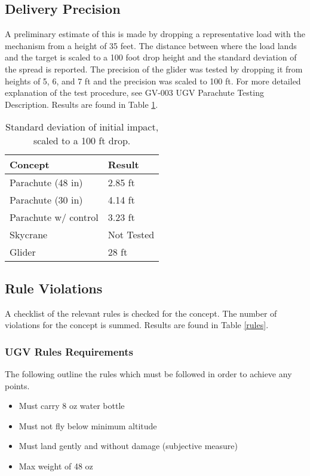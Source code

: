 \documentclass[]{auvsi_doc}
\begin{document}
	\subsection{Delivery Precision}

	A preliminary estimate of this is made by dropping a representative load with the mechanism from a height of 35 feet. The distance between where the load lands and the target is scaled to a 100 foot drop height and the standard deviation of the spread is reported. The precision of the glider was tested by dropping it from heights of 5, 6, and 7 ft and the precision was scaled to 100 ft. For more detailed explanation of the test procedure, see GV-003 UGV Parachute Testing Description. Results are found in Table \ref{precision}.

	\begin{table}[!h]
	\centering

	\caption{Standard deviation of initial impact, scaled to a 100 ft drop.}
	\label{precision}
	\begin{tabular}{|l|l|}
		\hline
		\rowcolor[HTML]{C0C0C0}
		\textbf{Concept}       & \textbf{Result} \\
		\hline
		Parachute (48 in)              &        2.85 ft        \\
		Parachute (30 in)		& 4.14 ft	\\
		Parachute w/ control   &      3.23 ft           \\
		Skycrane               &            Not Tested    \\
		Glider                 &		28 ft		 \\
		\hline
	\end{tabular}
	\end{table}

	\subsection{Rule Violations}


	A checklist of the relevant rules is checked for the concept. The number of violations for the concept is summed. Results are found in Table \ref{rules}.

\subsubsection{UGV Rules Requirements}
The following outline the rules which must be followed in order to achieve any points. 
\begin{itemize}
\item Must carry 8 oz water bottle
\item Must not fly below minimum altitude
\item Must land gently and without damage (subjective measure)
\item Max weight of 48 oz
\end{itemize}
\end{document}
